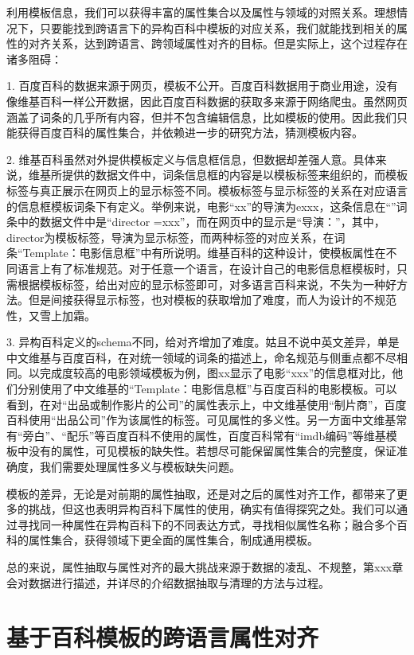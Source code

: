 利用模板信息，我们可以获得丰富的属性集合以及属性与领域的对照关系。理想情况下，只要能找到跨语言下的异构百科中模板的对应关系，我们就能找到相关的属性的对齐关系，达到跨语言、跨领域属性对齐的目标。但是实际上，这个过程存在诸多阻碍：

1.  百度百科的数据来源于网页，模板不公开。百度百科数据用于商业用途，没有像维基百科一样公开数据，因此百度百科数据的获取多来源于网络爬虫。虽然网页涵盖了词条的几乎所有内容，但并不包含编辑信息，比如模板的使用。因此我们只能获得百度百科的属性集合，并依赖进一步的研究方法，猜测模板内容。

2.  维基百科虽然对外提供模板定义与信息框信息，但数据却差强人意。具体来说，维基所提供的数据文件中，词条信息框的内容是以模板标签来组织的，而模板标签与真正展示在网页上的显示标签不同。模板标签与显示标签的关系在对应语言的信息框模板词条下有定义。举例来说，电影“xx”的导演为exxx，这条信息在“”词条中的数据文件中是“director =xxx”，而在网页中的显示是“导演：”，其中，director为模板标签，导演为显示标签，而两种标签的对应关系，在词条“Template：电影信息框”中有所说明。维基百科的这种设计，使模板属性在不同语言上有了标准规范。对于任意一个语言，在设计自己的电影信息框模板时，只需根据模板标签，给出对应的显示标签即可，对多语言百科来说，不失为一种好方法。但是间接获得显示标签，也对模板的获取增加了难度，而人为设计的不规范性，又雪上加霜。

3.  异构百科定义的schema不同，给对齐增加了难度。姑且不说中英文差异，单是中文维基与百度百科，在对统一领域的词条的描述上，命名规范与侧重点都不尽相同。以完成度较高的电影领域模板为例，图xx显示了电影“xxx”的信息框对比，他们分别使用了中文维基的“Template：电影信息框”与百度百科的电影模板。可以看到，在对“出品或制作影片的公司”的属性表示上，中文维基使用“制片商”，百度百科使用“出品公司”作为该属性的标签。可见属性的多义性。另一方面中文维基常有“旁白”、“配乐”等百度百科不使用的属性，百度百科常有“imdb编码”等维基模板中没有的属性，可见模板的缺失性。若想尽可能保留属性集合的完整度，保证准确度，我们需要处理属性多义与模板缺失问题。

模板的差异，无论是对前期的属性抽取，还是对之后的属性对齐工作，都带来了更多的挑战，但这也表明异构百科下属性的使用，确实有值得探究之处。我们可以通过寻找同一种属性在异构百科下的不同表达方式，寻找相似属性名称；融合多个百科的属性集合，获得领域下更全面的属性集合，制成通用模板。

总的来说，属性抽取与属性对齐的最大挑战来源于数据的凌乱、不规整，第xxx章会对数据进行描述，并详尽的介绍数据抽取与清理的方法与过程。

\section{基于百科模板的跨语言属性对齐}
\label{sec:property-matching}

